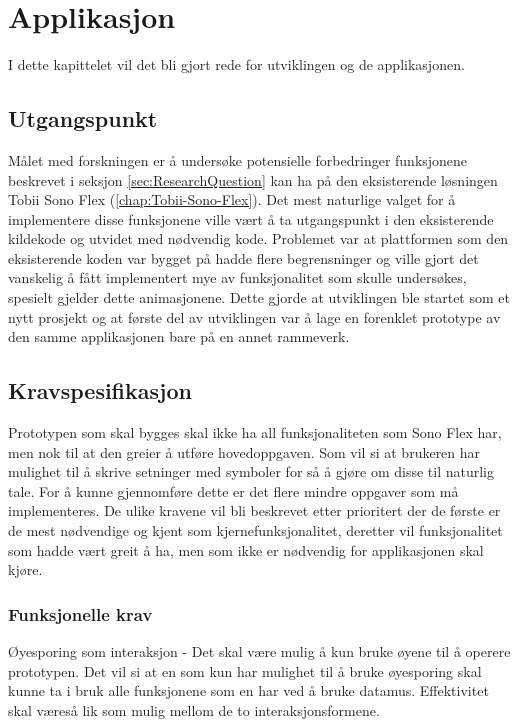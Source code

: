  
 
\chapter{Applikasjon} 
 
 
I dette kapittelet vil det bli gjort rede for utviklingen og de applikasjonen. 
 
 
\section{Utgangspunkt} 
\label{sec:utgangspunkt} 
 
 
Målet med forskningen er å undersøke potensielle forbedringer funksjonene beskrevet i seksjon \ref{sec:ResearchQuestion} kan ha på den eksisterende løsningen Tobii Sono Flex (\ref{chap:Tobii-Sono-Flex}). Det mest naturlige valget for å implementere disse funksjonene ville vært å ta utgangspunkt i den eksisterende kildekode og utvidet med nødvendig kode. Problemet var at plattformen som den eksisterende koden var bygget på hadde flere begrensninger og ville gjort det vanskelig å fått implementert mye av funksjonalitet som skulle undersøkes, spesielt gjelder dette animasjonene. Dette gjorde at utviklingen ble startet som et nytt prosjekt og at første del av utviklingen var å lage en forenklet prototype av den samme applikasjonen bare på en annet rammeverk. 
 
 
\section{Kravspesifikasjon} 
 
Prototypen som skal bygges skal ikke ha all funksjonaliteten som Sono Flex har, men nok til at den greier å utføre hovedoppgaven. Som vil si at brukeren har mulighet til å skrive setninger med symboler for så å gjøre om disse til naturlig tale. For å kunne gjennomføre dette er det flere mindre oppgaver som må implementeres.  De ulike kravene vil bli beskrevet etter prioritert der de første er de mest nødvendige og kjent som kjernefunksjonalitet, deretter vil funksjonalitet som hadde vært greit å ha, men som ikke er nødvendig for applikasjonen skal kjøre.  
 
 
\subsection{Funksjonelle krav} 
 
 
Øyesporing som interaksjon - Det skal være mulig å kun bruke øyene til å operere prototypen. Det vil si at en som kun har mulighet til å bruke øyesporing skal kunne ta i bruk alle funksjonene som en har ved å bruke datamus.  Effektivitet skal væreså lik som mulig mellom de to interaksjonsformene. 
 
